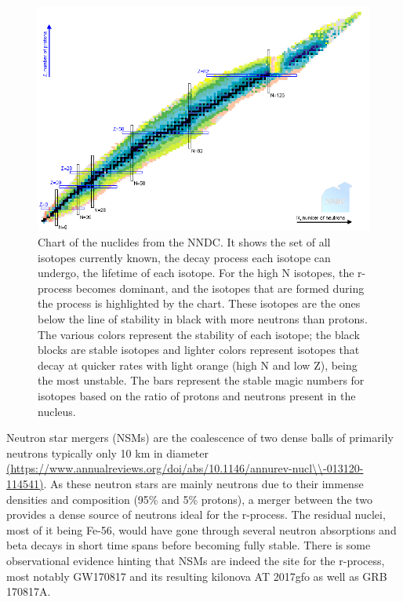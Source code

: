 \documentclass[11pt,a4paper]{article}
\begin{document}
\begin{figure}[h!]
  \includegraphics[width=1\textwidth , scale = .5]{nuclides_chart.png}
  \caption{Chart of the nuclides from the NNDC. It shows the set of all isotopes currently known, the decay process each isotope can undergo, the lifetime of each isotope. For the high N isotopes, the r-process becomes dominant, and the isotopes that are formed during the process is highlighted by the chart. These isotopes are the ones below the line of stability in black with more neutrons than protons. The various colors represent the stability of each isotope; the black blocks are stable isotopes and lighter colors represent isotopes that decay at quicker rates with light orange (high N and low Z), being the most unstable. The bars represent the stable magic numbers for isotopes based on the ratio of protons and neutrons present in the nucleus.}
\end{figure} 

Neutron star mergers (NSMs) are the coalescence of two dense balls of primarily neutrons typically only 10 km in diameter \url{(https://www.annualreviews.org/doi/abs/10.1146/annurev-nucl\\-013120-114541)}. As these neutron stars are mainly neutrons due to their immense densities and composition (95\% and 5\% protons), a merger between the two provides a dense source of neutrons ideal for the r-process. The residual nuclei, most of it being Fe-56, would have gone through several neutron absorptions and beta decays in short time spans before becoming fully stable. There is some observational evidence hinting that NSMs are indeed the site for the r-process, most notably GW170817 and its resulting kilonova AT 2017gfo as well as GRB 170817A. 
\end{document}
